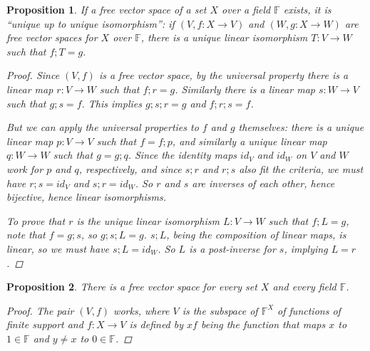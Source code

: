 \documentclass[a4paper,14pt]{article}
\newtheorem*{prop}{Proposition}
\begin{document}
\begin{prop}
    If a free vector space of a set $X$ over a field $\mathbb{F}$ exists, it is ``unique up to unique isomorphism'': if $(V, f: X \to V)$ and $(W, g: X \to W)$ are free vector spaces for $X$ over $\mathbb{F}$, there is a unique linear isomorphism $T: V \to W$ such that $f;T = g$.

\begin{proof}
    Since $(V, f)$ is a free vector space, by the universal property there is a linear map $r: V \to W$ such that $f;r = g$. Similarly there is a linear map $s: W \to V$ such that $g;s = f$. This implies $g;s;r = g$ and $f;r;s = f$.

\begin{center}
\end{center}

 But we can apply the universal properties to $f$ and $g$ themselves: there is a unique linear map $p: V \to V$ such that $f = f;p$, and similarly a unique linear map $q: W \to W$ such that $g = g;q$. Since the identity maps $id_V$ and $id_W$ on $V$ and $W$ work for $p$ and $q$, respectively, and since $s;r$ and $r;s$ also fit the criteria, we must have $r;s = id_V$ and $s;r = id_W$. So $r$ and $s$ are inverses of each other, hence bijective, hence linear isomorphisms.

To prove that $r$ is the unique linear isomorphism $L: V \to W$ such that $f;L = g$, note that $f = g;s$, so $g;s;L = g$. $s;L$, being the composition of linear maps, is linear, so we must have $s;L = id_W$. So $L$ is a post-inverse for $s$, implying $L = r$.
\end{proof}
\end{prop}

\begin{prop}
There is a free vector space for every set $X$ and every field $\mathbb{F}$.
\begin{proof}
    The pair $(V, f)$ works, where $V$ is the subspace of $\mathbb{F}^X$ of functions of finite support and $f: X \to V$ is defined by $xf$ being the function that maps $x$ to $1 \in \mathbb{F}$ and $y \neq x$ to $0 \in \mathbb{F}$.
\end{proof}
\end{prop}
\end{document}

